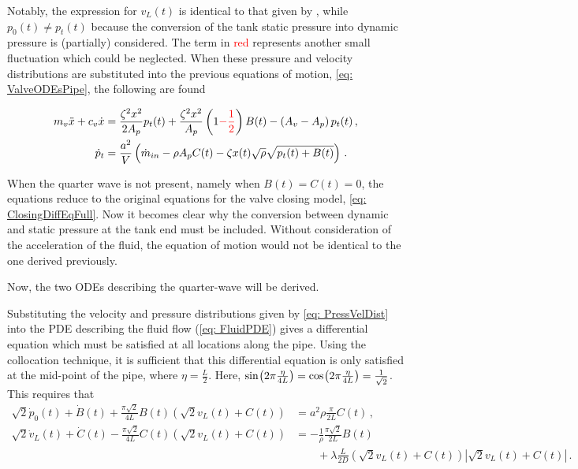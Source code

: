 Notably, the expression for $v_L(t)$ is identical to that given by \cite{Hos2015ModelPipe}, while $p_0(t) \neq p_t(t)$ because the conversion of the tank static pressure into dynamic pressure is (partially) considered. The term in \textcolor{Red}{red} represents another small fluctuation which could be neglected. When these pressure and velocity distributions are substituted into the previous equations of motion, \cref{eq: ValveODEsPipe}, the following are found

\begin{equation*}
\begin{split}
    m_v \ddot{x} + c_v \dot{x} &= \frac{\zeta^2 x^2}{2 A_p} p_t(t) + \frac{\zeta^2 x^2}{A_p} \left( 1 \textcolor{Red}{- \frac{1}{2}} \right) B(t) - \left( A_v - A_p \right) p_t(t)
    \, , \\
    \dot{p}_t &= \frac{a^2}{V} \left( \dot{m}_{in} - \rho A_p C(t) - \zeta x(t) \sqrt{\rho} \sqrt{p_t(t) + B(t)} \right) \, .
\end{split}
\end{equation*}

When the quarter wave is not present, namely when $B(t) = C(t) = 0$, the equations reduce to the original equations for the valve closing model, \cref{eq: ClosingDiffEqFull}. Now it becomes clear why the conversion between dynamic and static pressure at the tank end must be included. Without consideration of the acceleration of the fluid, the equation of motion would not be identical to the one derived previously.

Now, the two ODEs describing the quarter-wave will be derived.

Substituting the velocity and pressure distributions given by \cref{eq: PressVelDist} into the PDE describing the fluid flow (\cref{eq: FluidPDE}) gives a differential equation which must be satisfied at all locations along the pipe. Using the collocation technique, it is sufficient that this differential equation is only satisfied at the mid-point of the pipe, where $\eta = \frac{L}{2}$. Here, $\fun{sin}{2 \pi \frac{\eta}{4L}} = \fun{cos}{2 \pi \frac{\eta}{4L}} = \frac{1}{\sqrt{2}}$.
This requires that
~
\begin{equation*}
\begin{split}
    \sqrt{2} \dot{p}_0(t) + \dot{B}(t) + \frac{\pi \sqrt{2}}{4 L} B(t) \left( \sqrt{2} v_L(t) + C(t) \right) &= a^2 \rho \frac{\pi}{2L} C(t) \, , \\
    \sqrt{2} \dot{v}_L(t) + \dot{C}(t) - \frac{\pi \sqrt{2}}{4 L} C(t) \left( \sqrt{2} v_L(t) + C(t) \right) &= - \frac{1}{\rho} \frac{\pi \sqrt{2}}{2 L} B(t) \\
    &\qquad + \lambda \frac{L}{2D} \left( \sqrt{2} v_L(t) + C(t) \right) \left| \sqrt{2} v_L(t) + C(t) \right| \, .
\end{split}
\end{equation*}

